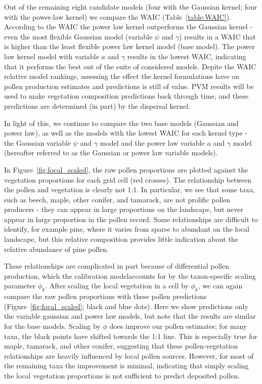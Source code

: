 \documentclass[12pt]{article}
\begin{document}
Out of the remaining eight candidate models (four with the Gaussian
kernel; four with the power-law kernel) we compare the WAIC
(Table~\ref{table:WAIC}). According to the WAIC the power law kernel
outperforms the Gaussian kernel - even the most flexible Gaussian
model (variable $\psi$ and $\gamma$) results in a WAIC that is higher
than the least flexible power law kernel model (base model). The power
law kernel model with variable $a$ and $\gamma$ results in the lowest
WAIC, indicating that it performs the best out of the suite of
considered models. Depite the WAIC relative model rankings, assessing
the effect the kernel formulations have on pollen production estimates
and predictions is still of value. PVM results will be used to make
vegetation composition predictions back through time, and these
predictions are determined (in part) by the dispersal kernel.

In light of this, we continue to compare the two base models (Gaussian
and power law), as well as the models with the lowest WAIC for each
kernel type - the Gaussian variable $\psi$ and $\gamma$ model and the
power law variable $a$ and $\gamma$ model (hereafter referred to as
the Gaussian or power law variable models).

In Figure~\ref{fig:focal_scaled}, the raw pollen proportions are
plotted against the vegetation proportions for each grid cell (red
crosses). The relationship between the pollen and vegetation is
clearly not 1:1. In particular, we see that some taxa, such as beech,
maple, other conifer, and tamarack, are not prolific pollen producers
- they can appear in large proportions on the landscape, but never
appear in large proportion in the pollen record. Some relationships
are difficult to identify, for example pine, where it varies from
sparse to abundant on the local landscape, but this relative
composition provides little indication about the relative abundance of
pine pollen.

These relationships are complicated in part because of differential
pollen production, which the calibration modelaccounts for by the
taxon-specific scaling parameter $\phi_k$. After scaling the local
vegetation in a cell by $\phi_k$, we can again compare the raw pollen
proportions with these pollen predictions
(Figure~\ref{fig:focal_scaled}; black and blue dots). Here we show
predictions only the variable gaussian and power law models, but note
that the results are similar for the base models. Scaling by $\phi$
does improve our pollen estimates; for many taxa, the black points
have shifted towards the 1:1 line. This is especially true for maple,
tamarack, and other conifer, suggesting that these pollen-vegetation
relationships are heavily influenced by local pollen sources. However,
for most of the remaining taxa the improvement is minimal, indicating
that simply scaling the local vegetation proportions is not sufficient
to predict deposited pollen.
\end{document}
